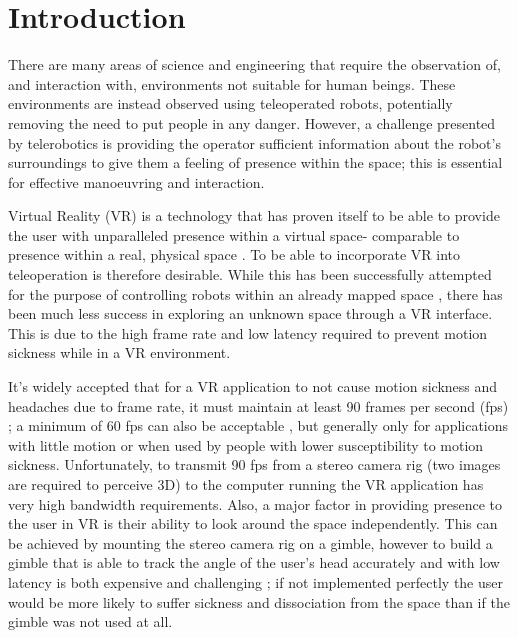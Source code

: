 \chapter{Introduction}

There are many areas of science and engineering that require the observation of, and interaction with, environments not suitable for human beings. These environments are instead observed using teleoperated robots, potentially removing the need to put people in any danger. However, a challenge presented by telerobotics is providing the operator sufficient information about the robot's surroundings to give them a feeling of presence \cite{presence} within the space; this is essential for effective manoeuvring and interaction.

Virtual Reality (VR) is a technology that has proven itself to be able to provide the user with unparalleled presence within a virtual space- comparable to presence within a real, physical space \cite{loomis2016presence,McGlynn}. To be able to incorporate VR into teleoperation is therefore desirable. While this has been successfully attempted for the purpose of controlling robots within an already mapped space \cite{bounds2016integrated}, there has been much less success in exploring an unknown space through a VR interface. This is due to the high frame rate and low latency required to prevent motion sickness while in a VR environment.

It's widely accepted that for a VR application to not cause motion sickness and headaches due to frame rate, it must maintain at least 90 frames per second (fps) \cite{FrameRate}; a minimum of 60 fps can also be acceptable \cite{Borg2013UsingAG}, but generally only for applications with little motion or when used by people with lower susceptibility to motion sickness. Unfortunately, to transmit 90 fps from a stereo camera rig (two images are required to perceive 3D) to the computer running the VR application has very high bandwidth requirements. Also, a major factor in providing presence to the user in VR is their ability to look around the space independently. This can be achieved by mounting the stereo camera rig on a gimble, however to build a gimble that is able to track the angle of the user's head accurately and with low latency is both expensive and challenging \cite{DORA}; if not implemented perfectly the user would be more likely to suffer sickness and dissociation from the space than if the gimble was not used at all.

